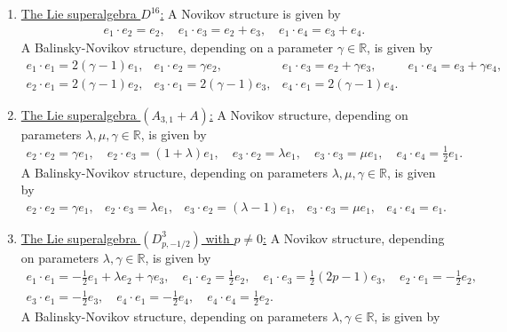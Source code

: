 \documentclass[12pt]{amsart}
\begin{document}
\begin{enumerate}
\[\begin{array}{llll}
= \gamma e_2, & 
e_1 \cdot e_3= e_2+ \gamma e_3,& e_1\cdot e_4=e_3 + \gamma e_4,\\[2mm]
e_2 \cdot e_1= 2 \gamma  e_2, & e_3\cdot e_1= 2 \gamma  e_3,& e_4\cdot e_1=2 \gamma  e_4.
 \end{array}
 \]
  \item \underline{The Lie superalgebra $D^{16}$:} A Novikov structure is given by 
    \[
\begin{array}{l}
e_1\cdot e_2= e_2, \quad e_1\cdot e_3= e_2+e_3, \quad e_1\cdot e_4=e_3+e_4.
\end{array}
 \]
A Balinsky-Novikov structure, depending on a parameter $\gamma \in \mathbb R$, is given by
 \[
 \begin{array}{llll}
e_1 \cdot e_1=  2 (\gamma-1)  e_1, & e_1 \cdot e_2
= \gamma e_2, & 
e_1 \cdot e_3= e_2+ \gamma e_3,& e_1\cdot e_4=e_3 + \gamma e_4,\\[2mm]
e_2 \cdot e_1= 2 (\gamma-1)  e_2, & e_3\cdot e_1= 2 (\gamma-1)  e_3,& e_4\cdot e_1=2 (\gamma-1)  e_4.
 \end{array}
 \]
   \item \underline{The Lie superalgebra $(A_{3,1}+A)$:} A Novikov structure, depending on parameters $\lambda, \mu, \gamma \in \mathbb R$, is given by  
    \[
\begin{array}{l}
e_2\cdot e_2= \gamma e_1, \quad e_2\cdot e_3= (1+\lambda) e_1, \quad e_3\cdot e_2= \lambda e_1, \quad e_3\cdot e_3=\mu e_1, \quad e_4\cdot e_4=\frac{1}{2} e_1.
\end{array}
 \]
A Balinsky-Novikov structure, depending on parameters $\lambda, \mu, \gamma \in \mathbb R$, is given by 
 \[
 \begin{array}{lllll}
e_2 \cdot e_2=  \gamma  e_1, & e_2 \cdot e_3
= \lambda e_1, & 
e_3 \cdot e_2= (\lambda -1)e_1,& e_3\cdot e_3=\mu e_1,& e_4\cdot e_4=e_1.
 \end{array}
 \]
  \item \underline{The Lie superalgebra $(D^3_{p,-1/2})$ with $p\not =0$:} A  Novikov structure, depending on parameters $\lambda, \gamma \in \mathbb R$, is given by 
    \[
\begin{array}{l}
e_1\cdot e_1=-\frac{1}{2}e_1+ \lambda e_2+\gamma e_3, \quad e_1\cdot e_2= \frac{1}{2} e_2, \quad e_1\cdot e_3= \frac{1}{2}(2p-1) e_3, \quad e_2\cdot e_1=-\frac{1}{2} e_2,\\[2mm]  
e_3\cdot e_1=-\frac{1}{2} e_3, \quad e_4\cdot e_1=-\frac{1}{2}e_4, \quad e_4\cdot e_4=\frac{1}{2}e_2.
\end{array}
\]
A Balinsky-Novikov structure, depending on parameters $\lambda, \gamma \in \mathbb R$, is given by 

\end{enumerate}
\end{document}
